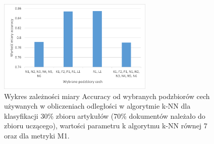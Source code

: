 \documentclass{classrep}
\begin{document}
\begin{figure}[H]
\centering
\includegraphics[width=0.66\textwidth]{wykres8.png}
\caption{Wykres zależności miary Accuracy od wybranych podzbiorów cech używanych w obliczeniach odległości w algorytmie k-NN dla klasyfikacji 30\% zbioru artykułów (70\% dokumentów należało do zbioru uczącego), wartości parametru k algorytmu k-NN równej 7 oraz dla metryki M1.}
\end{figure}
\end{document}
